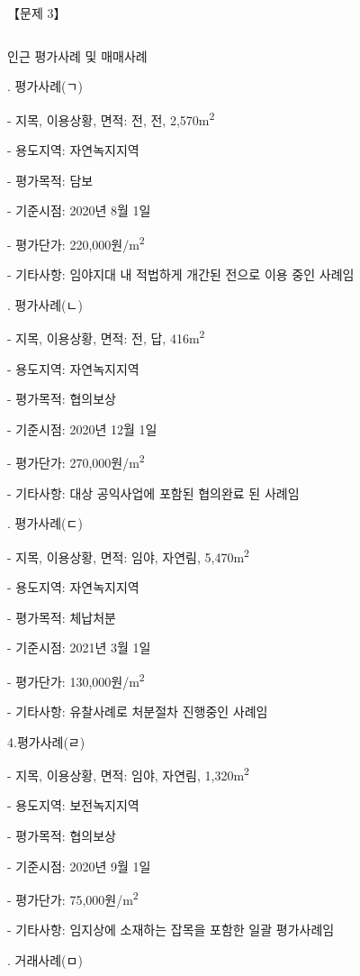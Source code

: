\begin{longquestion}{【문제 3】}
{{\begin{tabular}{|c|c|c|c|c|c|c|c|c|c|}
\end{tabular}}\par}
\medskip{} 인근 평가사례 및 매매사례 \par
\medskip{}. 평가사례(ㄱ) \par
- 지목, 이용상황, 면적: 전, 전, 2,570m\textsuperscript{2} \par
- 용도지역: 자연녹지지역 \par
- 평가목적: 담보 \par
- 기준시점: 2020년 8월 1일 \par
- 평가단가: 220,000원/m\textsuperscript{2} \par
- 기타사항: 임야지대 내 적법하게 개간된 전으로 이용 중인 사례임 \par
\medskip{}. 평가사례(ㄴ) \par
- 지목, 이용상황, 면적: 전, 답, 416m\textsuperscript{2} \par
- 용도지역: 자연녹지지역 \par
- 평가목적: 협의보상 \par
- 기준시점: 2020년 12월 1일 \par
- 평가단가: 270,000원/m\textsuperscript{2} \par
- 기타사항: 대상 공익사업에 포함된 협의완료 된 사례임 \par
\medskip{}. 평가사례(ㄷ) \par
- 지목, 이용상황, 면적: 임야, 자연림, 5,470m\textsuperscript{2} \par
- 용도지역: 자연녹지지역 \par
- 평가목적: 체납처분 \par
- 기준시점: 2021년 3월 1일 \par
- 평가단가: 130,000원/m\textsuperscript{2} \par
- 기타사항: 유찰사례로 처분절차 진행중인 사례임 \par
\medskip\noindent 4.평가사례(ㄹ) \par
- 지목, 이용상황, 면적: 임야, 자연림, 1,320m\textsuperscript{2} \par
- 용도지역: 보전녹지지역 \par
- 평가목적: 협의보상 \par
- 기준시점: 2020년 9월 1일 \par
- 평가단가: 75,000원/m\textsuperscript{2} \par
- 기타사항: 임지상에 소재하는 잡목을 포함한 일괄 평가사례임 \par
\medskip{}. 거래사례(ㅁ) \par

\end{longquestion}
